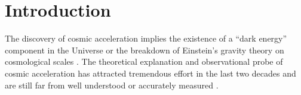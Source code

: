 \documentclass[iop]{emulateapj}
\begin{document}




\section{Introduction}

The discovery of cosmic acceleration \citep{Riess1998,Perl1999} implies the existence of a ``dark energy'' component in the Universe 
or the breakdown of Einstein's gravity theory on cosmological scales \citep[see ][for a recent review]{2012IJMPD..2130002Y}.
The theoretical explanation and observational probe of cosmic acceleration has attracted 
tremendous effort in the last two decades and are still far from well understood or accurately measured \citep{SW1989,Li2011,DHW2013}.
\end{document}
